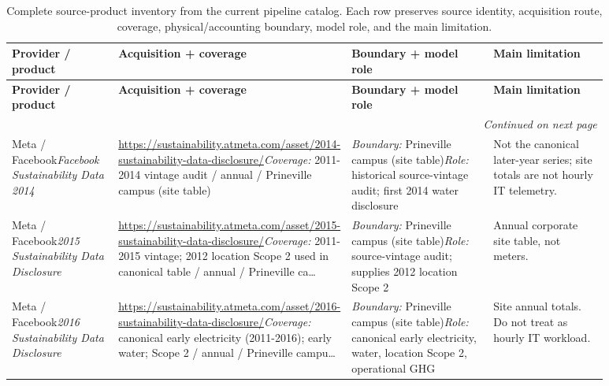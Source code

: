 \documentclass[11pt]{article}
\begin{document}
\iffalse
\begingroup
\scriptsize
\setlength{\tabcolsep}{3pt}
\setlength{\emergencystretch}{3em}
\raggedright
\sloppy
\begin{longtable}{@{}p{0.18\linewidth}p{0.25\linewidth}p{0.25\linewidth}p{0.20\linewidth}@{}}
\caption{Complete source-product inventory from the current pipeline catalog. Each row preserves source identity, acquisition route, coverage, physical/accounting boundary, model role, and the main limitation.}\\
\toprule
\textbf{Provider / product} & \textbf{Acquisition + coverage} & \textbf{Boundary + model role} & \textbf{Main limitation} \\
\midrule
\endfirsthead
\toprule
\textbf{Provider / product} & \textbf{Acquisition + coverage} & \textbf{Boundary + model role} & \textbf{Main limitation} \\
\midrule
\endhead
\midrule
\multicolumn{4}{r}{\emph{Continued on next page}}\\
\endfoot
\bottomrule
\endlastfoot
Meta / Facebook\newline \textit{Facebook Sustainability Data 2014} & \url{https://sustainability.atmeta.com/asset/2014-sustainability-data-disclosure/}\newline \textit{Coverage:} 2011-2014 vintage audit / annual / Prineville campus (site table) & \textit{Boundary:} Prineville campus (site table)\newline \textit{Role:} historical source-vintage audit; first 2014 water disclosure & Not the canonical later-year series; site totals are not hourly IT telemetry.\\
Meta / Facebook\newline \textit{2015 Sustainability Data Disclosure} & \url{https://sustainability.atmeta.com/asset/2015-sustainability-data-disclosure/}\newline \textit{Coverage:} 2011-2015 vintage; 2012 location Scope 2 used in canonical table / annual / Prineville ca\ldots & \textit{Boundary:} Prineville campus (site table)\newline \textit{Role:} source-vintage audit; supplies 2012 location Scope 2 & Annual corporate site table, not meters.\\
Meta / Facebook\newline \textit{2016 Sustainability Data Disclosure} & \url{https://sustainability.atmeta.com/asset/2016-sustainability-data-disclosure/}\newline \textit{Coverage:} canonical early electricity (2011-2016); early water; Scope 2 / annual / Prineville campu\ldots & \textit{Boundary:} Prineville campus (site table)\newline \textit{Role:} canonical early electricity, water, location Scope 2, operational GHG & Site annual totals. Do not treat as hourly IT workload.\\

\end{longtable}
\end{document}
